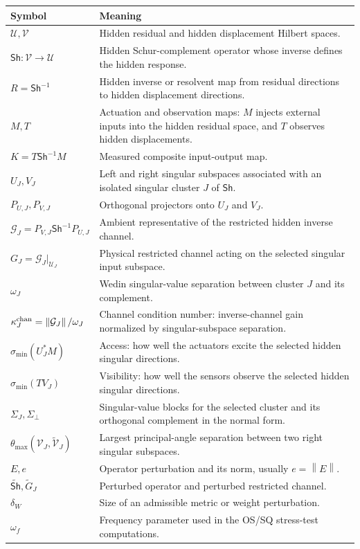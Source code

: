 \documentclass[review]{siamart220329}
\theoremstyle{definition}
\theoremstyle{remark}
\newcommand{\calU}{\mathcal{U}}
\newcommand{\calV}{\mathcal{V}}
\newcommand{\Sh}{\mathsf{Sh}}
\newcommand{\smin}{\sigma_{\min}}
\newcommand{\norm}[1]{\left\lVert #1\right\rVert}
\begin{document}
{\small
\renewcommand{\arraystretch}{1.08}
\begin{tabularx}{\textwidth}{@{}L{0.24\textwidth}Y@{}}
\toprule
\textbf{Symbol} & \textbf{Meaning}\\
\midrule
$\calU,\calV$ & Hidden residual and hidden displacement Hilbert spaces.\\
$\Sh:\calV\to\calU$ & Hidden Schur-complement operator whose inverse defines the hidden response.\\
$R=\Sh^{-1}$ & Hidden inverse or resolvent map from residual directions to hidden displacement directions.\\
$M,T$ & Actuation and observation maps: $M$ injects external inputs into the hidden residual space, and $T$ observes hidden displacements.\\
$K=T\Sh^{-1}M$ & Measured composite input-output map.\\
$U_J,V_J$ & Left and right singular subspaces associated with an isolated singular cluster $J$ of $\Sh$.\\
$P_{U,J},P_{V,J}$ & Orthogonal projectors onto $U_J$ and $V_J$.\\
$\mathcal G_J=P_{V,J}\Sh^{-1}P_{U,J}$ & Ambient representative of the restricted hidden inverse channel.\\
$G_J=\mathcal G_J|_{\calU_J}$ & Physical restricted channel acting on the selected singular input subspace.\\
$\omega_J$ & Wedin singular-value separation between cluster $J$ and its complement.\\
$\kappa_J^{\rm chan}=\norm{\mathcal G_J}/\omega_J$ & Channel condition number: inverse-channel gain normalized by singular-subspace separation.\\
$\smin(U_J^*M)$ & Access: how well the actuators excite the selected hidden singular directions.\\
$\smin(TV_J)$ & Visibility: how well the sensors observe the selected hidden singular directions.\\
$\Sigma_J,\Sigma_\perp$ & Singular-value blocks for the selected cluster and its orthogonal complement in the normal form.\\
$\theta_{\max}(\calV_J,\widetilde{\calV}_J)$ & Largest principal-angle separation between two right singular subspaces.\\
$E,e$ & Operator perturbation and its norm, usually $e=\norm{E}$.\\
$\widetilde{\Sh},\widetilde G_J$ & Perturbed operator and perturbed restricted channel.\\
$\delta_W$ & Size of an admissible metric or weight perturbation.\\
$\omega_f$ & Frequency parameter used in the OS/SQ stress-test computations.\\
\bottomrule
\end{tabularx}}
\label{tab:summary-notation}
\end{document}
